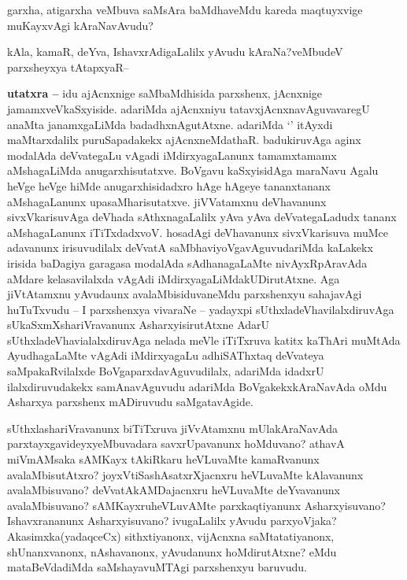 
\begin{artha}
garxha, atigarxha veMbuva saMsAra baMdhaveMdu kareda maqtuyxvige muKayxvAgi kAraNavAvudu?

kAla, kamaR, deYva, IshavxrAdigaLalilx yAvudu kAraNa?veMbudeV parxsheyxya tAtapxyaR--

\textbf{utatxra --} idu ajAcnxnige saMbaMdhisida parxshenx, jAcnxnige jamamxveVkaSxyiside. adariMda ajAcnxniyu tatavxjAcnxnavAguvavaregU  anaMta janamxgaLiMda badadhxnAgutAtxne. adariMda `\stext' itAyxdi maMtarxdalilx puruSapadakekx ajAcnxneMdathaR. badukiruvAga aginx modalAda deVvategaLu vAgadi iMdirxyagaLanunx tamamxtamamx aMshagaLiMda anugarxhisutatxve. BoVgavu kaSxyisidAga maraNavu Agalu heVge heVge hiMde  anugarxhisidadxro hAge hAgeye tananxtananx aMshagaLanunx upasaMharisutatxve. jiVVatamxnu deVhavanunx sivxVkarisuvAga deVhada sAthxnagaLalilx yAva yAva deVvategaLadudx tananx aMshagaLanunx iTiTxdadxvoV. hosadAgi deVhavanunx sivxVkarisuva muMce adavanunx irisuvudilalx deVvatA saMbhaviyoVgavAguvudariMda kaLakekx irisida baDagiya garagasa modalAda sAdhanagaLaMte nivAyxRpAravAda aMdare kelasavilalxda vAgAdi iMdirxyagaLiMdakUDirutAtxne. Aga jiVtAtamxnu yAvudaunx  avalaMbisiduvaneMdu parxshenxyu sahajavAgi huTuTxvudu -- I parxshenxya vivaraNe -- yadayxpi sUthxladeVhavilalxdiruvAga sUkaSxmXshariVravanunx AsharxyisirutAtxne AdarU sUthxladeVhavialalxdiruvAga nelada meVle iTiTxruva katitx kaThAri muMtAda AyudhagaLaMte vAgAdi iMdirxyagaLu adhiSAThxtaq deVvateya saMpakaRvilalxde BoVgaparxdavAguvudilalx, adariMda idadxrU ilalxdiruvudakekx samAnavAguvudu adariMda BoVgakekxkAraNavAda oMdu Asharxya parxshenx mADiruvudu saMgatavAgide.

sUthxlashariVravanunx biTiTxruva jiVvAtamxnu mUlakAraNavAda parxtayxgavideyxyeMbuvadara savxrUpavanunx hoMduvano? athavA miVmAMsaka sAMKayx tAkiRkaru heVLuvaMte kamaRvanunx avalaMbisutAtxro? joyxVtiSashAsatxrXjacnxru heVLuvaMte kAlavanunx avalaMbisuvano? deVvatAkAMDajacnxru heVLuvaMte deYvavanunx avalaMbisuvano? sAMKayxruheVLuvAMte parxkaqtiyanunx Asharxyisuvano? Ishavxrananunx Asharxyisuvano? ivugaLalilx yAvudu parxyoVjaka? Akasimxka(yadaqceCx) sithxtiyanonx, vijAcnxna saMtatatiyanonx, shUnanxvanonx, nAshavanonx, yAvudanunx hoMdirutAtxne? eMdu mataBeVdadiMda saMshayavuMTAgi parxshenxyu baruvudu.


\end{artha}
